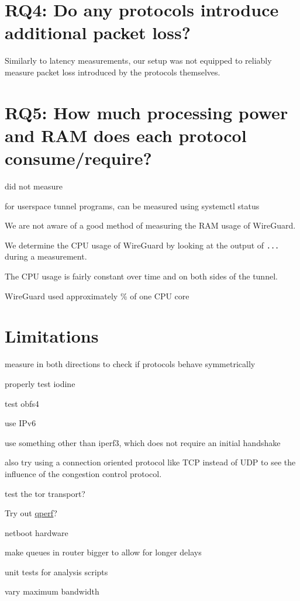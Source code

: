 \section{RQ4: Do any protocols introduce additional packet loss?}
Similarly to latency measurements, our setup was not equipped to reliably measure packet loss introduced by the protocols themselves.



\section{RQ5: How much processing power and RAM does each protocol consume/require?}
did not measure

for userspace tunnel programs, can be measured using systemctl status

We are not aware of a good method of measuring the RAM usage of WireGuard.

We determine the CPU usage of WireGuard by looking at the output of \texttt{...} during a measurement.

The CPU usage is fairly constant over time and on both sides of the tunnel.

WireGuard used approximately \% of one CPU core


\section{Limitations}

measure in both directions to check if protocols behave symmetrically

properly test iodine

test obfs4

use IPv6

use something other than iperf3, which does not require an initial handshake

also try using a connection oriented protocol like TCP instead of UDP to see the influence of the congestion control protocol.

test the tor transport? 

Try out \href{https://github.com/rbruenig/qperf}{qperf}?

netboot hardware

make queues in router bigger to allow for longer delays

unit tests for analysis scripts

vary maximum bandwidth

